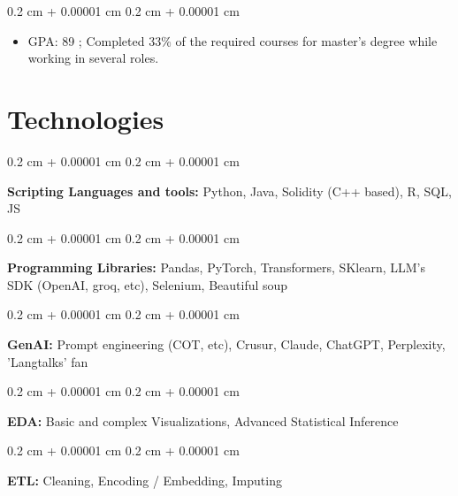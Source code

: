 \documentclass[10pt, letterpaper]{article}
\newenvironment{highlights}{
    \begin{itemize}[
        topsep=0.10 cm,
        parsep=0.10 cm,
        partopsep=0pt,
        itemsep=0pt,
        leftmargin=0.4 cm + 10pt
    ]
}{
    \end{itemize}
} %
\newenvironment{onecolentry}{
    \begin{adjustwidth}{
        0.2 cm + 0.00001 cm
    }{
        0.2 cm + 0.00001 cm
    }
}{
    \end{adjustwidth}
} %
\begin{document}
        \vspace{0.10 cm}
        \begin{onecolentry}
            \begin{highlights}
                \item GPA: 89 ; Completed 33\% of the required courses for master's degree while working in several roles.
            \end{highlights}
        \end{onecolentry}



    
    \section{Technologies}



        
        \begin{onecolentry}
            \textbf{Scripting Languages and tools:} Python, Java, Solidity (C++ based), R, SQL, JS
        \end{onecolentry}

        \vspace{0.2 cm}

        \begin{onecolentry}
            \textbf{Programming Libraries:} Pandas, PyTorch, Transformers, SKlearn, LLM's SDK (OpenAI, groq, etc), Selenium, Beautiful soup
        \end{onecolentry}

        \vspace{0.2 cm}

        \begin{onecolentry}
            \textbf{GenAI:} Prompt engineering (COT, etc), Crusur, Claude, ChatGPT, Perplexity, 'Langtalks' fan
        \end{onecolentry}

        \vspace{0.2 cm}

        \begin{onecolentry}
            \textbf{EDA:} Basic and complex Visualizations, Advanced Statistical Inference
        \end{onecolentry}

        \vspace{0.2 cm}

        \begin{onecolentry}
            \textbf{ETL:} Cleaning, Encoding / Embedding, Imputing
        \end{onecolentry}
\end{document}
